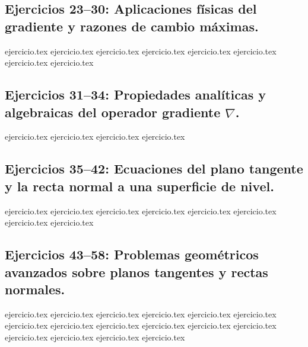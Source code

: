 \subsection*{Ejercicios 23--30: Aplicaciones físicas del gradiente y razones de cambio máximas.}
\begin{enumerate}
    \setcounter{enumi}{22}
    {ejercicio.tex}
    {ejercicio.tex}
    {ejercicio.tex}
    {ejercicio.tex}
    {ejercicio.tex}
    {ejercicio.tex}
    {ejercicio.tex}
    {ejercicio.tex}
\end{enumerate}

\subsection*{Ejercicios 31--34: Propiedades analíticas y algebraicas del operador gradiente $\nabla$.}
\begin{enumerate}
    \setcounter{enumi}{30}
    {ejercicio.tex}
    {ejercicio.tex}
    {ejercicio.tex}
    {ejercicio.tex}
\end{enumerate}

\subsection*{Ejercicios 35--42: Ecuaciones del plano tangente y la recta normal a una superficie de nivel.}
\begin{enumerate}
    \setcounter{enumi}{34}
    {ejercicio.tex}
    {ejercicio.tex}
    {ejercicio.tex}
    {ejercicio.tex}
    {ejercicio.tex}
    {ejercicio.tex}
    {ejercicio.tex}
    {ejercicio.tex}
\end{enumerate}

\subsection*{Ejercicios 43--58: Problemas geométricos avanzados sobre planos tangentes y rectas normales.}
\begin{enumerate}
    \setcounter{enumi}{42}
    {ejercicio.tex}
    {ejercicio.tex}
    {ejercicio.tex}
    {ejercicio.tex}
    {ejercicio.tex}
    {ejercicio.tex}
    {ejercicio.tex}
    {ejercicio.tex}
    {ejercicio.tex}
    {ejercicio.tex}
    {ejercicio.tex}
    {ejercicio.tex}
    {ejercicio.tex}
    {ejercicio.tex}
    {ejercicio.tex}
    {ejercicio.tex}
\end{enumerate}
